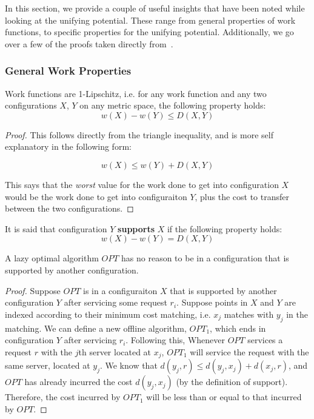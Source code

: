 In this section, we provide a couple of useful insights that have been noted while looking at the unifying potential. These range from general properties of work functions, to specific properties for the unifying potential. Additionally, we go over a few of the proofs taken directly from~\cite{unifyingPotential2021}. 

\subsubsection*{General Work Properties}

\begin{lemma}
    \label{lem:lip}
    Work functions are 1-Lipschitz, i.e. for any work function and any two configurations $X$, $Y$ on any metric space, the following property holds: 
    \begin{equation*}
        w(X) - w(Y) \leq D(X, Y)
    \end{equation*} 
\end{lemma}

\begin{proof}
    This follows directly from the triangle inequality, and is more self explanatory in the following form: 
    
    \begin{equation*}
        w(X) \leq w(Y) + D(X, Y)
    \end{equation*}

    This says that the \textit{worst} value for the work done to get into configuration $X$ would be the work done to get into configuraiton $Y$, plus the cost to transfer between the two configurations.
\end{proof}

\begin{definition}
    It is said that configuration $Y$ \textbf{supports} $X$ if the following property holds:
    \begin{equation*}
        w(X) - w(Y) = D(X,Y)
    \end{equation*}
\end{definition}

\begin{lemma}
    A lazy optimal algorithm $OPT$ has no reason to be in a configuration that is supported by another configuration.
\end{lemma}

\begin{proof}
    Suppose $OPT$ is in a configuraiton $X$ that is supported by another configuration $Y$ after servicing some request $r_i$. Suppose points in $X$ and $Y$ are indexed according to their minimum cost matching, i.e. $x_j$ matches with $y_j$ in the matching. We can define a new offline algorithm, $OPT_1$, which ends in configuration $Y$ after servicing $r_i$. Following this, Whenever $OPT$ services a request $r$ with the $j$th server located at $x_j$, $OPT_1$ will service the request with the same server, located at $y_j$. We know that $d(y_j, r) \leq d(y_j, x_j) + d(x_j, r)$, and $OPT$ has already incurred the cost $d(y_j, x_j)$ (by the definition of support). Therefore, the cost incurred by $OPT_1$ will be less than or equal to that incurred by $OPT$.
\end{proof}

